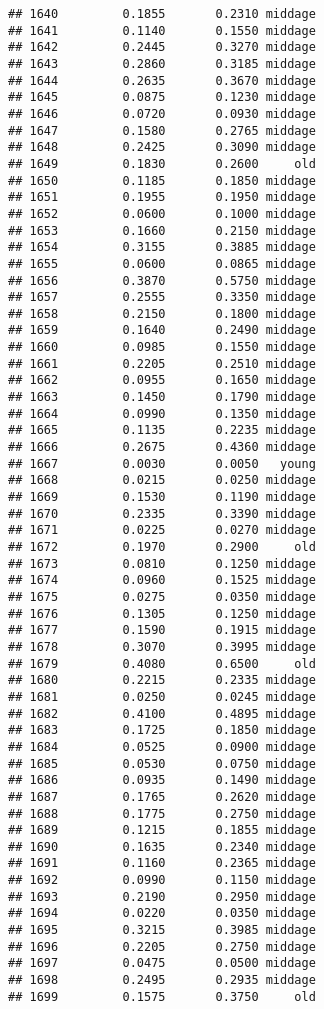 \documentclass[
]{article}
\begin{document}
\begin{verbatim}
## 1640         0.1855       0.2310 middage
## 1641         0.1140       0.1550 middage
## 1642         0.2445       0.3270 middage
## 1643         0.2860       0.3185 middage
## 1644         0.2635       0.3670 middage
## 1645         0.0875       0.1230 middage
## 1646         0.0720       0.0930 middage
## 1647         0.1580       0.2765 middage
## 1648         0.2425       0.3090 middage
## 1649         0.1830       0.2600     old
## 1650         0.1185       0.1850 middage
## 1651         0.1955       0.1950 middage
## 1652         0.0600       0.1000 middage
## 1653         0.1660       0.2150 middage
## 1654         0.3155       0.3885 middage
## 1655         0.0600       0.0865 middage
## 1656         0.3870       0.5750 middage
## 1657         0.2555       0.3350 middage
## 1658         0.2150       0.1800 middage
## 1659         0.1640       0.2490 middage
## 1660         0.0985       0.1550 middage
## 1661         0.2205       0.2510 middage
## 1662         0.0955       0.1650 middage
## 1663         0.1450       0.1790 middage
## 1664         0.0990       0.1350 middage
## 1665         0.1135       0.2235 middage
## 1666         0.2675       0.4360 middage
## 1667         0.0030       0.0050   young
## 1668         0.0215       0.0250 middage
## 1669         0.1530       0.1190 middage
## 1670         0.2335       0.3390 middage
## 1671         0.0225       0.0270 middage
## 1672         0.1970       0.2900     old
## 1673         0.0810       0.1250 middage
## 1674         0.0960       0.1525 middage
## 1675         0.0275       0.0350 middage
## 1676         0.1305       0.1250 middage
## 1677         0.1590       0.1915 middage
## 1678         0.3070       0.3995 middage
## 1679         0.4080       0.6500     old
## 1680         0.2215       0.2335 middage
## 1681         0.0250       0.0245 middage
## 1682         0.4100       0.4895 middage
## 1683         0.1725       0.1850 middage
## 1684         0.0525       0.0900 middage
## 1685         0.0530       0.0750 middage
## 1686         0.0935       0.1490 middage
## 1687         0.1765       0.2620 middage
## 1688         0.1775       0.2750 middage
## 1689         0.1215       0.1855 middage
## 1690         0.1635       0.2340 middage
## 1691         0.1160       0.2365 middage
## 1692         0.0990       0.1150 middage
## 1693         0.2190       0.2950 middage
## 1694         0.0220       0.0350 middage
## 1695         0.3215       0.3985 middage
## 1696         0.2205       0.2750 middage
## 1697         0.0475       0.0500 middage
## 1698         0.2495       0.2935 middage
## 1699         0.1575       0.3750     old

\end{verbatim}
\end{document}
